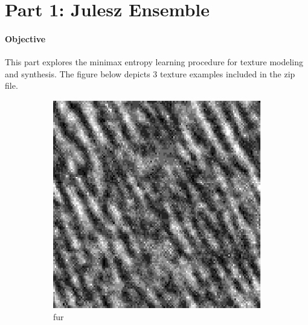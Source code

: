 \documentclass[11pt]{article}
\begin{document}
\clearpage

\section{Part 1: Julesz Ensemble}

\paragraph{Objective}

This part explores the minimax entropy learning procedure for texture modeling and synthesis. The figure below depicts 3 texture examples included in the zip file.

\begin{figure}[ht!]
    \centering
    \hfill%
    \begin{subfigure}[]{0.333\linewidth}
        \centering
        \includegraphics[width=\linewidth]{figs_for_latex_only/image1.jpeg}
        \caption{fur}
    \end{subfigure}%
    \hfill%
    \begin{subfigure}[]{0.333\linewidth}
        \centering

\end{subfigure}
\end{figure}
\end{document}
